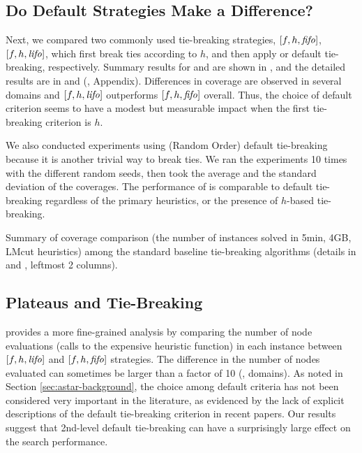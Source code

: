 \subsection{Do Default Strategies Make a Difference?}

Next, we  compared two commonly used tie-breaking strategies, $[f,h,{\text{\textit{fifo}}}]$, $[f,h,{\text{\textit{lifo}}}]$, which
first break ties according to $h$, and then apply \fifo or \lifo
default tie-breaking, respectively.
Summary results for \lmcut and \mands are
shown in , and the detailed results are in  and  (, Appendix).
Differences in coverage are observed in several domains and $[f,h,{\text{\textit{lifo}}}]$ outperforms $[f,h,{\text{\textit{fifo}}}]$ overall. Thus, the choice of default criterion seems to have a modest but measurable impact when the first tie-breaking criterion is $h$.

We also conducted experiments using \ro (Random Order) default tie-breaking because it is another trivial way to
break ties. We ran the experiments 10 times with the different random seeds, then took the average and the
standard deviation of the coverages. The performance of \ro is comparable to \fifo default tie-breaking regardless
of the primary heuristics, or the presence of $h$-based tie-breaking.

\begin{table}[htbp]
 {
 \centering
 
 \caption{
 Summary of coverage comparison (the number of instances solved in 5min, 4GB, LMcut
 heuristics) among
 the standard baseline tie-breaking algorithms (details in  and , leftmost 2 columns). 
 }
 \label{tbl:summary-std}
 }
\end{table}

\subsection{Plateaus and Tie-Breaking}

 provides a
more fine-grained analysis by comparing the number of node evaluations
(calls to the expensive \lmcut heuristic function) in each instance between $[f,h,{\text{\textit{lifo}}}]$ and $[f,h,{\text{\textit{fifo}}}]$ strategies.
The difference in the number of nodes
evaluated can sometimes be larger than a factor of 10 (,  domains).
As noted in Section \ref{sec:astar-background}, the choice among default criteria has not been considered very important in the literature, as evidenced by the lack of explicit descriptions of the default tie-breaking criterion in recent papers. 
Our results suggest that 2nd-level default tie-breaking can have a surprisingly large effect on
the search performance.

